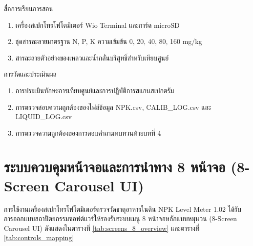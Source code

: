\begin{planbox}{สื่อการเรียนการสอน}
\begin{enumerate}[leftmargin=1.5em, itemsep=1pt]
    \item เครื่องสเปกโทรโฟโตมิเตอร์ Wio Terminal และการ์ด microSD
    \item ชุดสารละลายมาตรฐาน N, P, K ความเข้มข้น 0, 20, 40, 80, 160 mg/kg
    \item สารละลายตัวอย่างของเหลวและน้ำกลั่นบริสุทธิ์สำหรับเทียบศูนย์
\end{enumerate}
\end{planbox}

\begin{planbox}{การวัดและประเมินผล}
\begin{enumerate}[leftmargin=1.5em, itemsep=1pt]
    \item การประเมินทักษะการเทียบศูนย์และการปฏิบัติการสแกนสเปกตรัม
    \item การตรวจสอบความถูกต้องของไฟล์ข้อมูล NPK.csv, CALIB\_LOG.csv และ LIQUID\_LOG.csv
    \item การตรวจความถูกต้องของการตอบคำถามทบทวนท้ายบทที่ 4
\end{enumerate}
\end{planbox}

\clearpage

\section{ระบบควบคุมหน้าจอและการนำทาง 8 หน้าจอ (8-Screen Carousel UI)}
การใช้งานเครื่องสเปกโทรโฟโตมิเตอร์ตรวจวัดธาตุอาหารในดิน NPK Level Meter 1.02 ได้รับการออกแบบสถาปัตยกรรมซอฟต์แวร์ให้รองรับระบบเมนู 8 หน้าจอหลักแบบหมุนวน (8-Screen Carousel UI) ดังแสดงในตารางที่ \ref{tab:screens_8_overview} และตารางที่ \ref{tab:controls_mapping}

